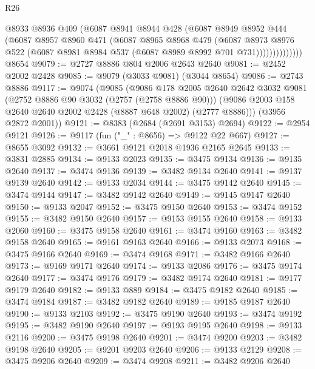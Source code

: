 \begin{lexlean}{R26}
\begin{coremodule}
                  @8933
                  @8936
                  @409
                  (@6087
                    @8941
                    @8944
                    @428
                    (@6087
                      @8949
                      @8952
                      @444
                      (@6087
                        @8957
                        @8960
                        @471
                        (@6087
                          @8965
                          @8968
                          @479
                          (@6087
                            @8973
                            @8976
                            @522
                            (@6087 @8981 @8984 @537 (@6087 @8989 @8992 @701 @731))))))))))))))
    @8654
@9079 := @2727 @8886 @804 @2006 @2643 @2640
@9081 := @2452 @2002 @2428
@9085 := @9079 (@3033 @9081) (@3044 @8654)
@9086 := @2743 @8886
@9117 := @9074
    (@9085
      (@9086
        @178
        @2005
        @2640
        @2642
        @3032
        @9081
        (@2752 @8886 @90 @3032 (@2757 (@2758 @8886 @90)))
        (@9086 @2003 @158 @2640 @2640 @2002 @2428 (@8887 @648 @2002) (@2777 @8886)))
      (@3956 @2872 @2001))
@9121 := @8383 (@2684 (@2691 @3153) @2694)
@9122 := @2954 @9121
@9126 := @9117 (fun ("_" : @8656) => @9122 @22 @667)
@9127 := @8655 @3092
@9132 := @3661 @9121 @2018 @1936 @2165 @2645
@9133 := @3831 @2885
@9134 := @9133 @2023
@9135 := @3475 @9134
@9136 := @9135 @2640
@9137 := @3474 @9136
@9139 := @3482 @9134 @2640
@9141 := @9137 @9139 @2640
@9142 := @9133 @2034
@9144 := @3475 @9142 @2640
@9145 := @3474 @9144
@9147 := @3482 @9142 @2640
@9149 := @9145 @9147 @2640
@9150 := @9133 @2047
@9152 := @3475 @9150 @2640
@9153 := @3474 @9152
@9155 := @3482 @9150 @2640
@9157 := @9153 @9155 @2640
@9158 := @9133 @2060
@9160 := @3475 @9158 @2640
@9161 := @3474 @9160
@9163 := @3482 @9158 @2640
@9165 := @9161 @9163 @2640
@9166 := @9133 @2073
@9168 := @3475 @9166 @2640
@9169 := @3474 @9168
@9171 := @3482 @9166 @2640
@9173 := @9169 @9171 @2640
@9174 := @9133 @2086
@9176 := @3475 @9174 @2640
@9177 := @3474 @9176
@9179 := @3482 @9174 @2640
@9181 := @9177 @9179 @2640
@9182 := @9133 @889
@9184 := @3475 @9182 @2640
@9185 := @3474 @9184
@9187 := @3482 @9182 @2640
@9189 := @9185 @9187 @2640
@9190 := @9133 @2103
@9192 := @3475 @9190 @2640
@9193 := @3474 @9192
@9195 := @3482 @9190 @2640
@9197 := @9193 @9195 @2640
@9198 := @9133 @2116
@9200 := @3475 @9198 @2640
@9201 := @3474 @9200
@9203 := @3482 @9198 @2640
@9205 := @9201 @9203 @2640
@9206 := @9133 @2129
@9208 := @3475 @9206 @2640
@9209 := @3474 @9208
@9211 := @3482 @9206 @2640

\end{coremodule}
\end{lexlean}
